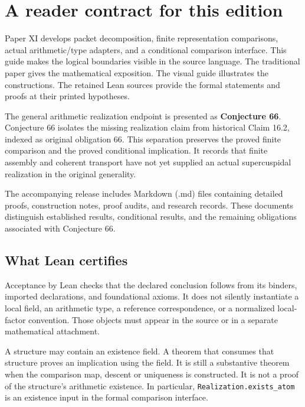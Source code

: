 \documentclass[10pt,oneside]{book}
\begin{document}
\KomorebiCover
{}
\frontmatter

\tableofcontents\mainmatter
\chapter{A reader contract for this edition}
Paper XI develops packet decomposition, finite representation comparisons, actual arithmetic/type adapters, and a conditional comparison interface. This guide makes the logical boundaries visible in the source language. The traditional paper gives the mathematical exposition. The visual guide illustrates the constructions. The retained Lean sources provide the formal statements and proofs at their printed hypotheses.

The general arithmetic realization endpoint is presented as \textbf{Conjecture 66}. Conjecture 66 isolates the missing realization claim from historical Claim 16.2, indexed as original obligation 66. This separation preserves the proved finite comparison and the proved conditional implication. It records that finite assembly and coherent transport have not yet supplied an actual supercuspidal realization in the original generality.

The accompanying release includes Markdown (.md) files containing detailed proofs, construction notes, proof audits, and research records. These documents distinguish established results, conditional results, and the remaining obligations associated with Conjecture 66.

\section{What Lean certifies}
Acceptance by Lean checks that the declared conclusion follows from its binders, imported declarations, and foundational axioms. It does not silently instantiate a local field, an arithmetic type, a reference correspondence, or a normalized local-factor convention. Those objects must appear in the source or in a separate mathematical attachment.

A structure may contain an existence field. A theorem that consumes that structure proves an implication using the field. It is still a substantive theorem when the comparison map, descent or uniqueness is constructed. It is not a proof of the structure's arithmetic existence. In particular, \texttt{Realization.exists\_atom} is an existence input in the formal comparison interface.
\end{document}
